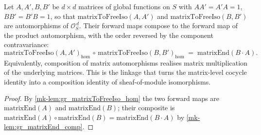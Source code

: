 \begin{lemma}\label{mk-lem:gr_matrixToFreeIso_mul}
  \leanok

  Let \(A, A', B, B'\) be \(d \times d\) matrices of global functions on \(S\) with
  \(A A' = A' A = 1\), \(B B' = B' B = 1\), so that \(\mathrm{matrixToFreeIso}(A, A')\)
  and \(\mathrm{matrixToFreeIso}(B, B')\) are automorphisms of \(\mathcal{O}_S^{\,d}\).
  Their forward maps compose to the forward map of the product automorphism, with the
  order reversed by the component contravariance:
  \[
    \mathrm{matrixToFreeIso}(A, A')_{\mathrm{hom}}
      \,\circ\, \mathrm{matrixToFreeIso}(B, B')_{\mathrm{hom}}
      \;=\; \mathrm{matrixEnd}(B \cdot A).
  \]
  Equivalently, composition of matrix automorphisms realises matrix multiplication of
  the underlying matrices. This is the linkage that turns the matrix-level cocycle
  identity into a composition identity of sheaf-of-module isomorphisms.
\end{lemma}
\begin{proof}
  By \ref{mk-lem:gr_matrixToFreeIso_hom} the two forward maps are
  \(\mathrm{matrixEnd}(A)\) and \(\mathrm{matrixEnd}(B)\); their composite is
  \(\mathrm{matrixEnd}(A)\circ\mathrm{matrixEnd}(B) = \mathrm{matrixEnd}(B\cdot A)\) by
  \ref{mk-lem:gr_matrixEnd_comp}.
\end{proof}

